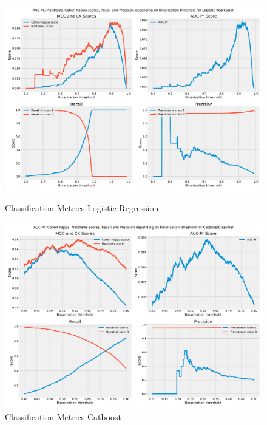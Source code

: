 \begin{figure}[htpb]
	\centering
	\includegraphics[width=1\textwidth]{../imgs/pdf_files/scores_lr.pdf}
	\caption{Classification Metrics Logistic Regression}
	\label{fig:logreg}
	\endminipage
	\hfill
	\centering
	\includegraphics[width=1\textwidth]{../imgs/pdf_files/scores_cbc.pdf}
	\caption{Classification Metrics Catboost}
	\label{fig:cbc}
	\endminipage
\end{figure}

